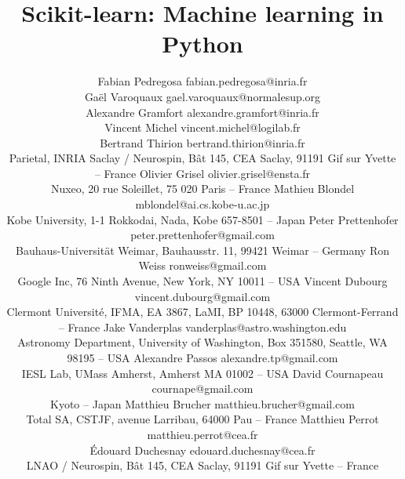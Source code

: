 \documentclass[twoside,11pt]{article}
\begin{document}
\title{Scikit-learn: Machine learning in Python}


\author{\name Fabian Pedregosa \email fabian.pedregosa@inria.fr \\
        \name Ga\"el Varoquaux \email gael.varoquaux@normalesup.org  \\
        \name Alexandre Gramfort \email alexandre.gramfort@inria.fr \\
        \name Vincent Michel  \email vincent.michel@logilab.fr \\
        \name Bertrand Thirion  \email bertrand.thirion@inria.fr \\
        \addr Parietal, INRIA Saclay / Neurospin,
      B\^at 145, CEA Saclay, 91191 Gif sur Yvette -- {\sc France}
        \AND
        \name Olivier Grisel \email olivier.grisel@ensta.fr \\
        \addr Nuxeo, 20 rue Soleillet, 75 020 Paris -- {\sc France} 
        \AND
        \name Mathieu Blondel \email mblondel@ai.cs.kobe-u.ac.jp \\
        \addr Kobe University, 1-1 Rokkodai, Nada, Kobe 657-8501 -- {\sc Japan}
        \AND
        \name Peter Prettenhofer \email peter.prettenhofer@gmail.com \\
        \addr Bauhaus-Universit\"at Weimar, Bauhausstr. 11, 99421 Weimar -- {\sc Germany}
        \AND
        \name Ron Weiss \email ronweiss@gmail.com \\
        \addr Google Inc, 76 Ninth Avenue, New York, NY 10011 -- {\sc USA}
        \AND
        \name Vincent Dubourg \email vincent.dubourg@gmail.com\\
        \addr Clermont Universit\'e, IFMA, EA 3867, LaMI,
        BP 10448, 63000 Clermont-Ferrand -- {\sc France}
        \AND
        \name Jake Vanderplas \email vanderplas@astro.washington.edu\\
        \addr Astronomy Department, University of Washington, Box 351580, 
	Seattle, WA 98195 -- {\sc USA}
	\AND
        \name Alexandre Passos \email alexandre.tp@gmail.com \\
        \addr IESL Lab, UMass Amherst, Amherst MA 01002 -- {\sc USA}
        \AND
        \name David Cournapeau \email cournape@gmail.com \\
        \addr Kyoto -- {\sc Japan}
        \AND
        \name Matthieu Brucher \email matthieu.brucher@gmail.com \\
        \addr Total SA, CSTJF, avenue Larribau, 64000 Pau -- {\sc France}
        \AND
        \name Matthieu Perrot \email matthieu.perrot@cea.fr\\
        \name \'Edouard Duchesnay \email edouard.duchesnay@cea.fr \\
        \addr LNAO / Neurospin,
      B\^at 145, CEA Saclay, 91191 Gif sur Yvette -- {\sc France}
}
\end{document}
